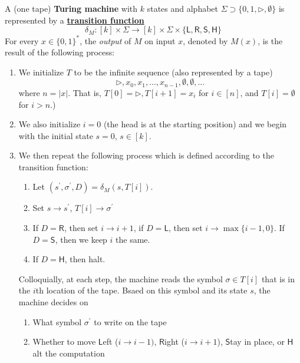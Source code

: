   \begin{definition}
    \label{def:turing-machine}
    A (one tape) \textbf{Turing machine} with $k$ states and alphabet $\Sigma \supset \{0, 1, \triangleright, \emptyset\}$ is represented by a \textbf{\hyperref[sm-def:transition-function]{transition function}} 
    \begin{equation}
      \delta_M: [k] \times \Sigma \to [k] \times \Sigma \times \{\mathsf{L, R, S, H}\}
    \end{equation}
    For every $x \in \{0,1\}^*$, the \textit{output} of $M$ on input $x$, denoted by $M(x)$, is the result of the following process: 
    \begin{enumerate}
        \item We initialize $T$ to be the infinite sequence (also represented by a tape)
        \begin{equation}
          \triangleright, x_0, x_1, ..., x_{n-1}, \emptyset, \emptyset, ...
        \end{equation}
        where $n = |x|$. That is, $T[0] = \triangleright, T[i+1] = x_i$ for $i \in [n]$, and $T[i] = \emptyset$ for $i>n$.)
        \item We also initialize $i = 0$ (the head is at the starting position) and we begin with the initial state $s=0$, $s \in [k]$. 
        \item We then repeat the following process which is defined according to the transition function: 
        \begin{enumerate}
            \item Let $(s^\prime, \sigma^\prime, D) = \delta_M (s, T[i])$.
            \item Set $s \rightarrow s^\prime$, $T[i] \rightarrow \sigma^\prime$
            \item If $D = \mathsf{R}$, then set $i \rightarrow i+1$, if $D = \mathsf{L}$, then set $i \rightarrow \max\{i-1,0\}$. If $D = \mathsf{S}$, then we keep $i$ the same. 
            \item If $D = \mathsf{H}$, then halt. 
        \end{enumerate}
        Colloquially, at each step, the machine reads the symbol $\sigma \in T[i]$ that is in the $i$th location of the tape. Bsaed on this symbol and its state $s$, the machine decides on
        \begin{enumerate}
            \item What symbol $\sigma^\prime$ to write on the tape
            \item Whether to move $\mathsf{L}$eft ($i \rightarrow i-1)$, $\mathsf{R}$ight ($i \rightarrow i+1$), $\mathsf{S}$tay in place, or $\mathsf{H}$alt the computation 

\end{enumerate}
\end{enumerate}
\end{definition}
